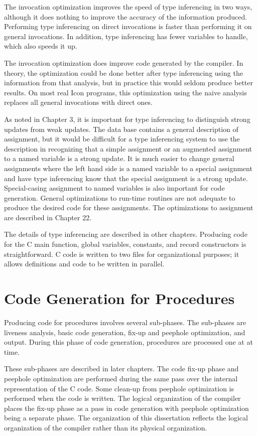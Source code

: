 The invocation optimization improves the speed of type inferencing in
two ways, although it does nothing to improve the accuracy of the
information produced. Performing type inferencing on direct
invocations is faster than performing it on general invocations. In
addition, type inferencing has fewer variables to handle, which also
speeds it up.

The invocation optimization does improve code generated by the
compiler. In theory, the optimization could be done better after type
inferencing using the information from that analysis, but in practice
this would seldom produce better results. On most real Icon programs,
this optimization using the naive analysis replaces all general
invocations with direct ones.

As noted in Chapter 3, it is important for type inferencing to
distinguish strong updates from weak updates. The data base contains a
general description of assignment, but it would be difficult for a
type inferencing system to use the description in recognizing that a
simple assignment or an augmented assignment to a named variable is a
strong update.  It is much easier to change general assignments where
the left hand side is a named variable to a special assignment and
have type inferencing know that the special assignment is a strong
update. Special-casing assignment to named variables is also important
for code generation. General optimizations to run-time routines are
not adequate to produce the desired code for these assignments. The
optimizations to assignment are described in Chapter 22.

The details of type inferencing are described in other
chapters. Producing code for the C main function, global variables,
constants, and record constructors is straightforward. C code is
written to two files for organizational purposes; it allows
definitions and code to be written in parallel.


\section{Code Generation for Procedures}

Producing code for procedures involves several sub-phases. The
sub-phases are liveness analysis, basic code generation, fix-up and
peephole optimization, and output. During this phase of code
generation, procedures are processed one at at time.

These sub-phases are described in later chapters. The code fix-up
phase and peephole optimization are performed during the same pass
over the internal representation of the C code. Some clean-up from
peephole optimization is performed when the code is written. The
logical organization of the compiler places the fix-up phase as a pass
in code generation with peephole optimization being a separate
phase. The organization of this dissertation reflects the logical
organization of the compiler rather than its physical organization.

